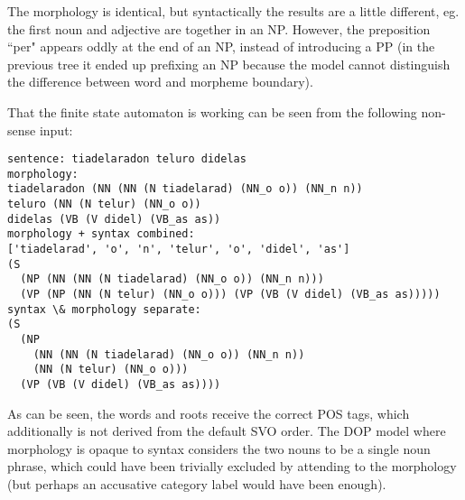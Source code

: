 \documentclass[10pt,a4paper]{article}
\begin{document}
The morphology is identical, but syntactically the results are a little
different, eg. the first noun and adjective are together in an NP. However,
the preposition ``per" appears oddly at the end of an NP, instead of
introducing a PP (in the previous tree it ended up prefixing an NP because the
model cannot distinguish the difference between word and morpheme boundary).

That the finite state automaton is working can be seen from
the following non-sense input:

\begin{verbatim}
sentence: tiadelaradon teluro didelas
morphology:
tiadelaradon (NN (NN (N tiadelarad) (NN_o o)) (NN_n n))
teluro (NN (N telur) (NN_o o))
didelas (VB (V didel) (VB_as as))
morphology + syntax combined:
['tiadelarad', 'o', 'n', 'telur', 'o', 'didel', 'as']
(S
  (NP (NN (NN (N tiadelarad) (NN_o o)) (NN_n n)))
  (VP (NP (NN (N telur) (NN_o o))) (VP (VB (V didel) (VB_as as)))))
syntax \& morphology separate:
(S
  (NP
    (NN (NN (N tiadelarad) (NN_o o)) (NN_n n))
    (NN (N telur) (NN_o o)))
  (VP (VB (V didel) (VB_as as))))
\end{verbatim}

As can be seen, the words and roots receive the correct POS tags, which
additionally is not derived from the default SVO order.
The DOP model where morphology is opaque to syntax considers the two nouns
to be a single noun phrase, which could have been trivially excluded by
attending to the morphology (but perhaps an accusative category label would
have been enough).

\begin{comment}
\subsection{Todo}

\item parse bitpar chart output into NLTK (currently only most probable derivation; 
  we need $n$ most probable parses and maybe shortest derivation, SL-DOP etc.)
\item use Reta Vortaro / ergane Esperanto dictionary and root lists 
  to induce segmentation / morphology model in a semi-supervised fashion.
\item check morphology coverage against vocabulary of Monato treebank
\item distinguish between morpheme and word boundaries (how?).
  possibly by having a trailing space as part of a morphological analysis 
  (but: this should not block inflection for plurality and accusative (+j and +n respectively).
\item finish report; evaluation \& conclusion.
  write about Dasgupta (2008) \& is there work on DOP + dependencies? 
  mention DLT as older exemplar model (prior art?).
\item look at DOP* / U-DOP
\end{comment}
\end{document}
